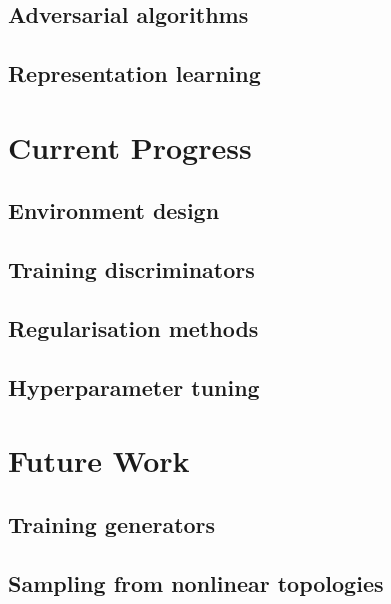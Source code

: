 \documentclass[a4paper]{article}
\begin{document}
\subsection{Adversarial algorithms}

\subsection{Representation learning}

\section{Current Progress}

\subsection{Environment design}

\subsection{Training discriminators}

\subsection{Regularisation methods}

\subsection{Hyperparameter tuning}

\section{Future Work}

\subsection{Training generators}

\subsection{Sampling from nonlinear topologies}
\end{document}
